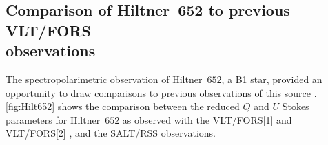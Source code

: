 

\subsection[Comparison of Hiltner~652 to VLT/FORS observations]{Comparison of Hiltner~652 to previous \gls{VLT}/\gls{FORS}\\observations}

The spectropolarimetric observation of Hiltner~$652$, a B1 star, provided an opportunity to draw comparisons to previous observations of this source \citep[presented in part in][]{Cooper_HEASA2022}.
\autoref{fig:Hilt652} shows the comparison between the reduced $Q$ and $U$ Stokes parameters for Hiltner~$652$ as observed with the \gls{VLT}/\gls{FORS}[1] and \gls{VLT}/\gls{FORS}[2] \citep[as reported by][]{FORS1, FORS2}, and the \gls{SALT}/\gls{RSS} observations.

